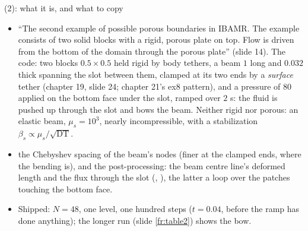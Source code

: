\documentclass[aspectratio=169,11pt]{beamer}
\begin{document}
\begin{frame}{ (2): what it is, and what to copy}
\label{fr:ex8b}
\footnotesize
\begin{itemize}
  \item ``The second example of possible porous boundaries in IBAMR. The example consists of two solid blocks with a rigid, porous plate on top. Flow is driven from the bottom of the domain through the porous plate'' (slide 14). The code: two blocks $0.5\times0.5$ held rigid by body tethers, a beam $1$ long and $0.032$ thick spanning the slot between them, clamped at its two ends by a \emph{surface} tether (chapter 19, slide 24; chapter 21's ex8 pattern), and a pressure of $80$ applied on the bottom face under the slot, ramped over $2$ s: the fluid is pushed up through the slot and bows the beam. Neither rigid nor porous: an elastic beam, $\mu_s = 10^3$, nearly incompressible, with a stabilization $\beta_s \propto \mu_s/\sqrt{\mathrm{DT}}$.
  \item {} the Chebyshev spacing of the beam's nodes (finer at the clamped ends, where the bending is), and the post-processing: the beam centre line's deformed length and the flux through the slot (, ), the latter a loop over the patches touching the bottom face.
  \item Shipped: $N = 48$, one level, one hundred steps ($t = 0.04$, before the ramp has done anything); the longer run (slide \ref{fr:table2}) shows the bow.
\end{itemize}
\end{frame}
\end{document}
